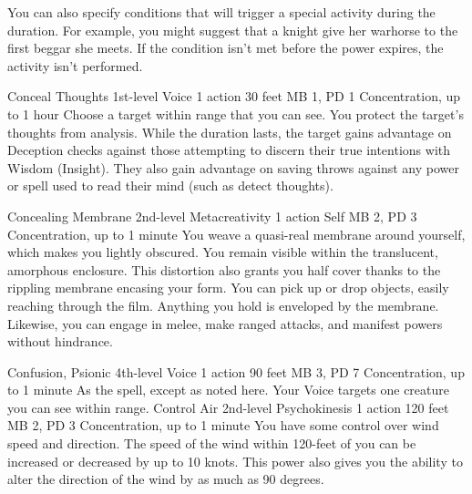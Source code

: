 You can also specify conditions that will trigger a special
activity during the duration. For example, you might suggest
that a knight give her warhorse to the first beggar she meets.
If the condition isn't met before the power expires, the
activity isn't performed.

\DndPowerHeader%
    {Conceal Thoughts\label{pwr:conceal_thoughts}}
    {1st-level Voice}
    {1 action}
    {30 feet}
    {MB 1, PD 1}
    {Concentration, up to 1 hour}
Choose a target within range that you can
see. You protect the target's thoughts from analysis. While
the duration lasts, the target gains advantage on Deception
checks against those attempting to discern their true intentions
with Wisdom (Insight). They also gain advantage on saving
throws against any power or spell used to read their mind
(such as detect thoughts).

\DndPowerHeader%
    {Concealing Membrane\label{pwr:concealing_membrane}}
    {2nd-level Metacreativity}
    {1 action}
    {Self}
    {MB 2, PD 3}
    {Concentration, up to 1 minute}
You weave a quasi-real membrane around yourself,
which makes you lightly obscured. You remain visible within
the translucent, amorphous enclosure. This distortion also
grants you half cover thanks to the rippling membrane encasing
your form. You can pick up or drop objects, easily reaching
through the film. Anything you hold is enveloped by the membrane.
Likewise, you can engage in melee, make ranged attacks, and
manifest powers without hindrance.

\DndPowerHeader%
    {Confusion, Psionic\label{pwr:confusion_psionic}}
    {4th-level Voice}
    {1 action}
    {90 feet}
    {MB 3, PD 7}
    {Concentration, up to 1 minute}
As the  spell, except as
noted here. Your Voice targets one creature you can see within
range.
\DndPowerHeader%
    {Control Air\label{pwr:control_air}}
    {2nd-level Psychokinesis}
    {1 action}
    {120 feet}
    {MB 2, PD 3}
    {Concentration, up to 1 minute}
You have some control over wind speed and
direction. The speed of the wind within 120-feet of you can
be increased or decreased by up to 10 knots. This power also
gives you the ability to alter the direction of the wind by
as much as 90 degrees.

